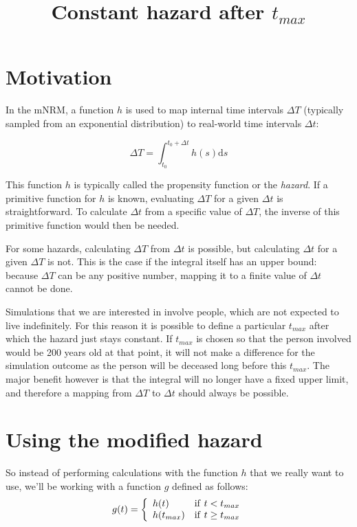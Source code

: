 \documentclass[a4paper,11pt]{article}
\newcommand{\ud}{\mathrm{d}}
\begin{document}
	\title{\bf Constant hazard after $t_{max}$}
	\maketitle

	\section{Motivation}

		In the mNRM, a function $h$ is used to map internal time intervals $\Delta T$ (typically
		sampled from an exponential distribution) to real-world time intervals $\Delta t$:
	
		\[ \Delta T = \int_{t_0}^{t_0+\Delta t} h(s) \ud s \]
	
		This function $h$ is typically called the propensity function or the {\em hazard}. If a
		primitive function for $h$ is known, evaluating $\Delta T$ for a given $\Delta t$ is
		straightforward. To calculate $\Delta t$ from a specific value of $\Delta T$, the inverse
		of this primitive function would then be needed.
	
		For some hazards, calculating $\Delta T$ from $\Delta t$ is possible, but calculating
		$\Delta t$ for a given $\Delta T$ is not. This is the case if the integral itself has
		an upper bound: because $\Delta T$ can be any positive number, mapping it to a finite
		value of $\Delta t$ cannot be done.
	
		Simulations that we are interested in involve people, which are not expected to live
		indefinitely. For this reason it is possible to define a particular $t_{max}$ after which
		the hazard just stays constant. If $t_{max}$ is chosen so that the person involved
		would be 200 years old at that point, it will not make a difference for the simulation
		outcome as the person will be deceased long before this $t_{max}$. The major benefit 
		however is that the integral will no longer have a fixed upper limit, and therefore a 
		mapping from $\Delta T$ to $\Delta t$ should always be possible.

	\section{Using the modified hazard}

		So instead of performing calculations with the function $h$ that we really want to use,
		we'll be working with a function $g$ defined as follows:
		\[ g(t) = \left\{
			\begin{array}{ll}
				h(t) & {\rm if\ } t < t_{max} \\
				h(t_{max}) & {\rm if\ } t \ge t_{max} 
			\end{array}
			\right.
		\]
\end{document}

